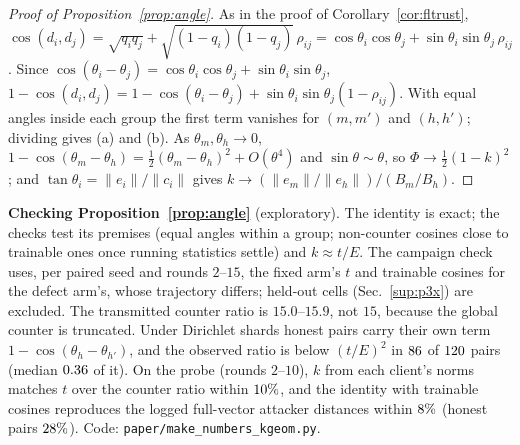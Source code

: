 \documentclass[journal]{IEEEtran}
\begin{document}
\begin{proof}[Proof of Proposition~\ref{prop:angle}]
As in the proof of Corollary~\ref{cor:fltrust}, $\cos(d_i,d_j)=\sqrt{q_iq_j}+\sqrt{(1-q_i)(1-q_j)}\,\rho_{ij}
=\cos\theta_i\cos\theta_j+\sin\theta_i\sin\theta_j\,\rho_{ij}$. Since
$\cos(\theta_i-\theta_j)=\cos\theta_i\cos\theta_j+\sin\theta_i\sin\theta_j$,
$1-\cos(d_i,d_j)=1-\cos(\theta_i-\theta_j)+\sin\theta_i\sin\theta_j(1-\rho_{ij})$. With
equal angles inside each group the first term vanishes for $(m,m')$ and $(h,h')$; dividing
gives (a) and (b). As $\theta_m,\theta_h\to0$,
$1-\cos(\theta_m-\theta_h)=\tfrac12(\theta_m-\theta_h)^2+O(\theta^4)$ and
$\sin\theta\sim\theta$, so $\Phi\to\tfrac12(1-k)^2$; and $\tan\theta_i=\|e_i\|/\|c_i\|$
gives $k\to(\|e_m\|/\|e_h\|)/(B_m/B_h)$.
\end{proof}

\textbf{Checking Proposition~\ref{prop:angle}} (exploratory). The identity is exact; the
checks test its premises (equal angles within a group; non-counter cosines close to
trainable ones once running statistics settle) and $k\approx t/E$. The campaign check uses,
per paired seed and rounds $2$--$15$, the fixed arm's $t$ and trainable cosines for the defect
arm's, whose trajectory differs; held-out cells (Sec.~\ref{sup:p3x}) are excluded. The
transmitted counter ratio is $15.0$--$15.9$, not $15$, because the global counter is truncated.
Under Dirichlet shards honest pairs carry their own term $1-\cos(\theta_h-\theta_{h'})$, and the
observed ratio is below $(t/E)^2$ in $86$ of $120$ pairs (median $0.36$ of
it). On the probe (rounds $2$--$10$), $k$ from each client's norms matches $t$ over the counter
ratio within $10\%$, and the identity with trainable cosines reproduces the logged
full-vector attacker distances within $8\%$ (honest pairs $28\%$).
Code: \texttt{paper/make\_numbers\_kgeom.py}.
\end{document}
